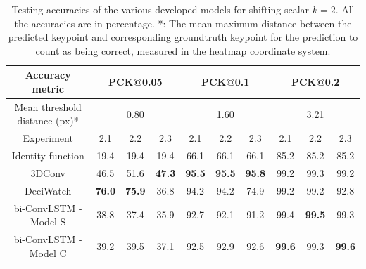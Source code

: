 \documentclass[./main.tex]{subfiles}
\begin{document}
\begin{table}[htbp]
    \begin{tabular}{c||ccc|ccc|ccc}
        \hline
        Accuracy metric & \multicolumn{3}{c}{PCK@0.05} & \multicolumn{3}{c}{PCK@0.1} & \multicolumn{3}{c}{PCK@0.2} \\
        \hline
        Mean threshold distance (px)* & \multicolumn{3}{c}{0.80} & \multicolumn{3}{c}{1.60} & \multicolumn{3}{c}{3.21} \\
        \hline
        Experiment & 2.1 & 2.2 & 2.3 & 2.1 & 2.2 & 2.3 & 2.1 & 2.2 & 2.3 \\
        \hline
        \hline
        Identity function & 19.4 & 19.4 & 19.4 & 66.1 & 66.1 & 66.1 & 85.2 & 85.2 & 85.2 \\
        3DConv & 46.5 & 51.6 & \textbf{47.3} & \textbf{95.5} & \textbf{95.5} & \textbf{95.8} & 99.2 & 99.3 & 99.2 \\
        DeciWatch & \textbf{76.0} & \textbf{75.9} & 36.8 & 94.2 & 94.2 & 74.9 & 99.2 & 99.2 & 92.8 \\
        bi-ConvLSTM - Model S & 38.8 & 37.4 & 35.9 & 92.7 & 92.1 & 91.2 & 99.4 & \textbf{99.5} & 99.3 \\
        bi-ConvLSTM - Model C & 39.2 & 39.5 & 37.1 & 92.5 & 92.9 & 92.6 & \textbf{99.6} & 99.3 & \textbf{99.6} \\
        \hline
    \end{tabular}
    \caption{Testing accuracies of the various developed models for shifting-scalar $k = 2$. All the accuracies are in percentage. *: The mean maximum distance between the predicted keypoint and corresponding groundtruth keypoint for the prediction to count as being correct, measured in the heatmap coordinate system.}
    \label{tab:finetune_test_accs_2}
\end{table}
\end{document}
